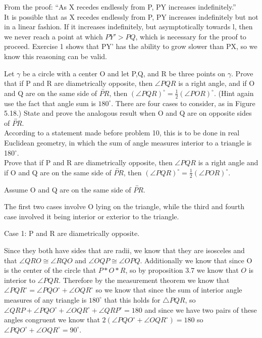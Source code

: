 \documentclass[12pt,letterpaper]{article}
\newcommand{\Proof}{\noindent {\bf Proof: }}
\newcommand{\prob}[1]{\newpage\noindent {\bf #1}}
\begin{document}
From the proof: ``As X recedes endlessly from P, PY increases indefinitely.''\\

It is possible that as X recedes endlessly from P, PY increases indefinitely but not in a linear fashion.  If it increases indefinitely, but asymptotically towards l, then we never reach a point at which $PY' > PQ$, which is necessary for the proof to proceed. Exercise 1 shows that PY' has the ability to grow slower than PX, so we know this reasoning can be valid. 



\prob{16} Let $\gamma$ be a circle with a center O and let P,Q, and R be three points on $\gamma$.  Prove that if P and R are diametrically opposite, then $\angle PQR$ is a right angle, and if O and Q are on the same side of $\overleftrightarrow{PR}$, then $(\angle PQR)^\circ = \frac{1}{2} (\angle POR)^\circ$.  (Hint again use the fact that angle sum is $180^\circ$.  There are four cases to consider, as in Figure 5.18.) State and prove the analogous result when O and Q are on opposite sides of $\overleftrightarrow{PR}$. \\


According to a statement made before problem 10, this is to be done in real Euclidean geometry, in which the sum of angle measures interior to a triangle is 180$^\circ$.\\


Prove that if P and R are diametrically opposite, then $\angle PQR$ is a right angle and if O and Q are on the same side of $\overleftrightarrow{PR}$, then $(\angle PQR)^\circ = \frac{1}{2} (\angle POR)^\circ$.\\

\Proof

Assume O and Q are on the same side of $\overleftrightarrow{PR}$.

The first two cases involve O lying on the triangle, while the third and fourth case involved it being interior or exterior to the triangle. 

Case 1: P and R are diametrically opposite.

Since they both have sides that are radii, we know that they are isosceles and that $\angle QRO \cong \angle RQO$ and $\angle OQP \cong \angle OPQ$. Additionally we know that since O is the center of the circle that $P*O*R$, so by proposition 3.7 we know that $O$ is interior to $\angle PQR$.   Therefore by the measurement theorem we know that $\angle PQR^\circ= \angle PQO^\circ+ \angle OQR^\circ$ so we know that since the sum of interior angle measures of any triangle is $180^\circ$ that this holds for $\triangle PQR$, so $\angle QRP + \angle PQO^\circ+ \angle OQR^\circ + \angle QRP^\circ = 180$ and since we have two pairs of these angles congruent we know that $2(\angle PQO^\circ+ \angle OQR^\circ) = 180$ so $\angle PQO^\circ+ \angle OQR^\circ = 90^\circ$. \\
\end{document}
